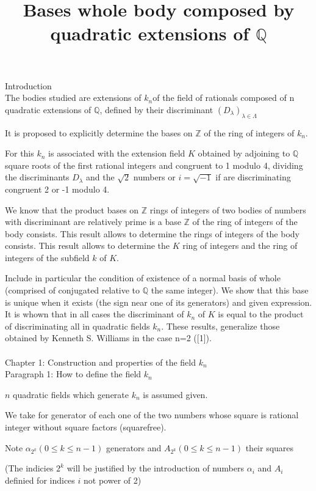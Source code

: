 \documentclass{article}
\title{Bases whole body composed by quadratic extensions of $\mathbb{Q}$}
\begin{document}
\maketitle
{\Large Introduction} \\
The bodies studied are extensions of $k_n$of the field of rationals composed of n quadratic extensions of $\mathbb{Q}$, defined by their discriminant $(D_\lambda)_{\lambda \in \Lambda}$
\par It is proposed to explicitly determine the bases on $\mathbb{Z}$ of the ring of integers of $k_n$. 
\par For this $k_n$ is associated with the extension field $K$ obtained by adjoining to $\mathbb{Q}$ square roots of the first rational integers and congruent to 1 modulo 4, dividing the discriminants $D_\lambda$ and the $\sqrt{2}$ numbers or $i = \sqrt{-1}$ if are discriminating congruent 2 or -1 modulo 4.
\par We know that the product bases on $\mathbb{Z}$ rings of integers of two bodies of numbers with discriminant are relatively prime is a base $\mathbb{Z}$ of the ring of integers of the body consists. This result allows to determine the rings of integers of the body consists. This result allows to determine the $K$ ring of integers and the ring of integers of the subfield $k$ of $K$.
\par Include in particular the condition of existence of a normal basis of whole (comprised of conjugated relative to $\mathbb{Q}$ the same integer). We show that this base is unique when it exists (the sign near one of its generators) and given expression. It is whown that in all cases the discriminant of $k_n$ of $K$ is equal to the product of discriminating all in quadratic fields $k_n$. These results, generalize those obtained by Kenneth S. Williams in the case n=2 ([1]). \\ \\
{\Large Chapter 1: Construction and properties of the field $k_n$ } \\
{\large Paragraph 1: How to define the field $k_n$}
\par $n$ quadratic fields which generate $k_n$ is assumed given.
\par We take for generator of each one of the two numbers whose square is rational integer without square factors (squarefree).
\par Note $\alpha_{2^k} (0\leq k \leq n-1)$ generators and $A_{2^k} (0\leq k \leq n-1)$ their squares
\par (The indicies $2^k$ will be justified by the introduction of numbers $\alpha_i$ and $A_i$ definied for indices $i$ not power of 2)
\end{document}
